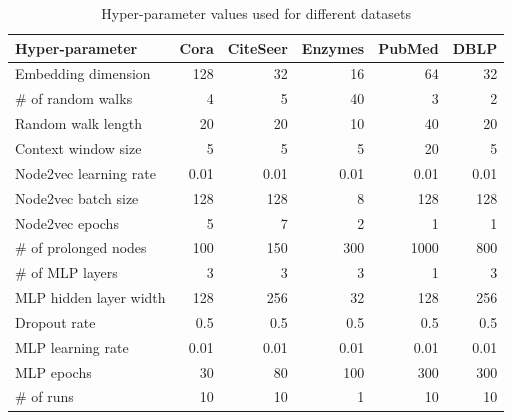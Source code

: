 \begin{table}
  \caption{Hyper-parameter values used for different datasets}
  \label{tab:hyperparameter-values}
  \begin{tabular}{lrrrrr}
    \toprule
    \textbf{Hyper-parameter} & \textbf{Cora} & \textbf{CiteSeer} & \textbf{Enzymes} & \textbf{PubMed} & \textbf{DBLP} \\
    \midrule
    Embedding dimension      & 128           & 32                & 16               & 64              & 32            \\
    \# of random walks       & 4             & 5                 & 40               & 3               & 2             \\
    Random walk length       & 20            & 20                & 10               & 40              & 20            \\
    Context window size      & 5             & 5                 & 5                & 20              & 5             \\
    Node2vec learning rate   & 0.01          & 0.01              & 0.01             & 0.01            & 0.01          \\
    Node2vec batch size      & 128           & 128               & 8                & 128             & 128           \\
    Node2vec epochs          & 5             & 7                 & 2                & 1               & 1             \\
    \# of prolonged nodes    & 100           & 150               & 300              & 1000            & 800           \\
    \# of MLP layers         & 3             & 3                 & 3                & 1               & 3             \\
    MLP hidden layer width   & 128           & 256               & 32               & 128             & 256           \\
    Dropout rate             & 0.5           & 0.5               & 0.5              & 0.5             & 0.5           \\
    MLP learning rate        & 0.01          & 0.01              & 0.01             & 0.01            & 0.01          \\
    MLP epochs               & 30            & 80                & 100              & 300             & 300           \\
    \# of runs               & 10            & 10                & 1                & 10              & 10            \\
    \bottomrule
  \end{tabular}
\end{table}


